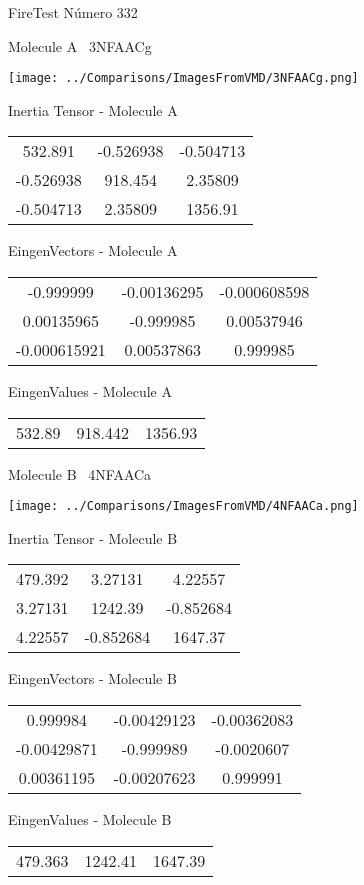 \vtab[-3cm]
\begin{center}
{\large FireTest \tab Número 332}
\end{center}
\begin{multicols}{2}
\begin{center}

Molecule A \
3NFAACg

\texttt{[image: ../Comparisons/ImagesFromVMD/3NFAACg.png]}

Inertia Tensor - Molecule A \\
\begin{tabular}{|c c c|}
532.891	 & 	-0.526938	 & 	-0.504713	 \\
-0.526938	 & 	918.454	 & 	2.35809	 \\
-0.504713	 & 	2.35809	 & 	1356.91
\end{tabular}

\vtab
 EingenVectors - Molecule A     \\
\begin{tabular}{|c c c|}
-0.999999	 & 	-0.00136295	 & 	-0.000608598	 \\
0.00135965	 & 	-0.999985	 & 	0.00537946	 \\
-0.000615921	 & 	0.00537863	 & 	0.999985
\end{tabular}

\vtab
 EingenValues - Molecule A     \\
\begin{tabular}{|c c c|}
532.89	 & 	918.442	 & 	1356.93	 \\
\end{tabular}
\columnbreak

Molecule B \
4NFAACa

\texttt{[image: ../Comparisons/ImagesFromVMD/4NFAACa.png]}

Inertia Tensor - Molecule B \\
\begin{tabular}{|c c c|}
479.392	 & 	3.27131	 & 	4.22557	 \\
3.27131	 & 	1242.39	 & 	-0.852684	 \\
4.22557	 & 	-0.852684	 & 	1647.37
\end{tabular}

\vtab
 EingenVectors - Molecule B     \\
\begin{tabular}{|c c c|}
0.999984	 & 	-0.00429123	 & 	-0.00362083	 \\
-0.00429871	 & 	-0.999989	 & 	-0.0020607	 \\
0.00361195	 & 	-0.00207623	 & 	0.999991
\end{tabular}

\vtab
 EingenValues - Molecule B     \\
\begin{tabular}{|c c c|}
479.363	 & 	1242.41	 & 	1647.39	 \\
\end{tabular}

\end{center}
\end{multicols}

